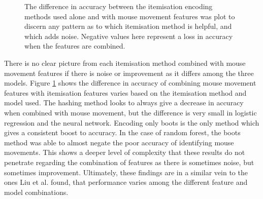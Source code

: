 \documentclass[Report.tex]{subfiles}
\begin{document}
\newcommand{\diffbarplot}[5]{
\addplot+[bar shift={#5}] coordinates { (Logistic Regression, #1) (Random Forest, #2) (Multi-layer Perceptron, #3) };
\addlegendentry{#4}
}
\makeatletter
\newcommand\resetstackedplots{
\makeatletter
\pgfplots@stacked@isfirstplottrue
\makeatother
\addplot [forget plot,draw=none] coordinates{(Logistic Regression,0) (Random Forest,0) (Multi-layer Perceptron,0)};
}
\makeatother
\begin{figure}[H]
\caption{The difference in accuracy between the itemisation encoding methods used alone and with mouse movement features was plot to discern any pattern as to which itemisation method is helpful, and which adds noise. Negative values here represent a loss in accuracy when the features are combined.}
\label{fig:itemisation-mouse-diff}
\end{figure}

There is no clear picture from each itemisation method combined with mouse movement features if there is noise or improvement as it differs among the three models. Figure \ref{fig:itemisation-mouse-diff} shows the difference in accuracy of combining mouse movement features with itemisation features varies based on the itemisation method and model used. The hashing method looks to always give a decrease in accuracy when combined with mouse movement, but the difference is very small in logistic regression and the neural network. Encoding only boots is the only method which gives a consistent boost to accuracy. In the case of random forest, the boots method was able to almost negate the poor accuracy of identifying mouse movements. This shows a deeper level of complexity that these results do not penetrate regarding the combination of features as there is sometimes noise, but sometimes improvement. Ultimately, these findings are in a similar vein to the ones Liu et al. \cite{starcraft-identification} found, that performance varies among the different feature and model combinations. 
\end{document}

